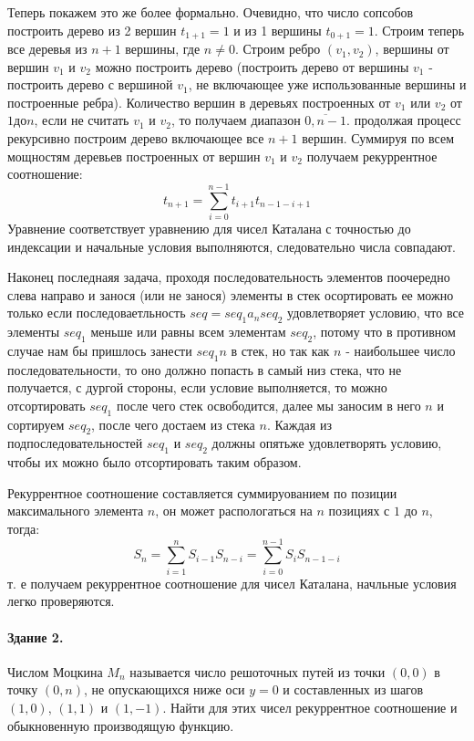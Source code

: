 \documentclass[a4paper,12pt]{article}
\begin{document}
\begin{Solution}
Теперь покажем это же более формально. Очевидно, что число сопсобов построить дерево из 2 вершин $t_{1+1} = 1$ и из 1 вершины $t_{0+1} = 1$. Строим теперь все деревья из $n+1$ вершины, где $n \not= 0$. Строим ребро $(v_1, v_2)$, вершины от вершин $v_1$ и $v_2$ можно построить дерево (построить дерево от вершины $v_1$ - построить дерево с вершиной $v_1$, не включающее уже использованные вершины и построенные ребра). Количество вершин в деревьях построенных от $v_1$ или $v_2$ от $1 до n$, если не считать $v_1$ и $v_2$, то получаем диапазон $\overline{0, n-1}$. продолжая процесс рекурсивно построим дерево включающее все $n+1$ вершин.  Суммируя по всем мощностям деревьев построенных от вершин $v_1$ и $v_2$ получаем рекуррентное соотношение:
\[
	t_{n+1} = \sum_{i=0}^{n-1} t_{i+1} t_{n-1-i+1}
\]
Уравнение соответствует уравнению для чисел Каталана с точностью до индексации и начальные условия выполняются, следовательно числа совпадают.

Наконец последнаяя задача, проходя последовательность элементов поочередно слева направо и занося (или не занося) элементы в стек осортировать ее можно только если последоваетльность $seq = seq_1 a_n seq_2$ удовлетворяет условию, что все элементы $seq_1$ меньше или равны всем элементам $seq_2$, потому что в противном случае нам бы пришлось занести $seq_1 n$ в стек, но так как $n$ - наибольшее число последовательности, то оно должно попасть в самый низ стека, что не получается, с дургой стороны, если условие выполняется, то можно отсортировать $seq_1$ после чего стек освободится, далее мы заносим в него $n$ и сортируем $seq_2$, после чего достаем из стека $n$. Каждая из подпоследовательностей $seq_1$ и $seq_2$ должны опятьже удовлетворять условию, чтобы их можно было отсортировать таким образом.

Рекуррентное соотношение составляется суммируованием по позиции максимального элемента $n$, он может распологаться на $n$ позициях с $1$ до $n$, тогда:
\[
	S_n = \sum_{i=1}^{n} S_{i-1} S_{n-i} = \sum_{i=0}^{n-1} S_{i} S_{n-1-i}
\]
т. е получаем рекуррентное соотношение для чисел Каталана, начльные условия легко проверяются.
\end{Solution}


\paragraph{Здание 2.} Числом Моцкина $M_n$ называется число решоточных путей из точки $(0,0)$ в точку $(0,n)$, не опускающихся ниже оси $y=0$ и составленных из шагов $(1,0)$, $(1,1)$ и $(1,-1)$. Найти для этих чисел рекуррентное соотношение и обыкновенную производящую функцию.
\end{document}
